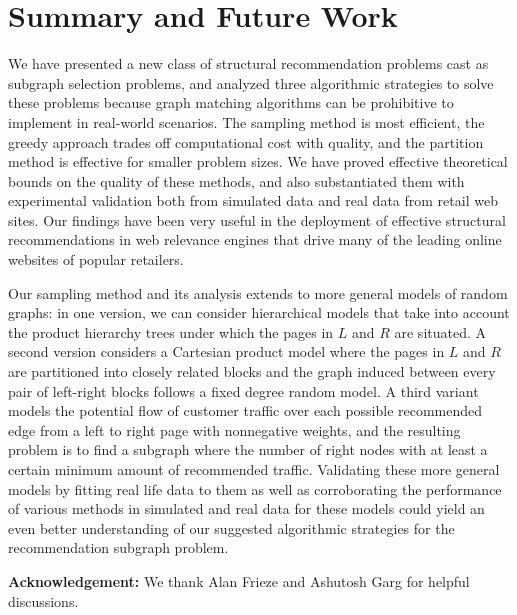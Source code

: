 \section{Summary and Future Work}
We have presented a new class of structural recommendation problems
cast as subgraph selection problems, and analyzed three algorithmic
strategies to solve these problems because graph matching algorithms can be
prohibitive to implement in real-world scenarios. The sampling method is most
efficient, the greedy approach trades off computational cost with
quality, and the partition method is effective for smaller problem
sizes. We have proved effective theoretical bounds on the quality
of these methods, and also substantiated them with experimental
validation both from simulated data and real data from
retail web sites. Our findings have been very useful in the
deployment of effective structural recommendations in web relevance
engines that drive many of the leading online websites of popular
retailers. \vs

Our sampling method and its analysis extends to more general
models of random graphs: in one version, we can consider
hierarchical models that take into account the product hierarchy
trees under which the pages in $L$ and $R$ are situated. A second
version considers a Cartesian product model where the pages in $L$
and $R$ are partitioned into closely related blocks and the graph
induced between every pair of left-right blocks follows a fixed
degree random model. A third variant models the potential flow of
customer traffic over each possible recommended edge from a left to
right page with nonnegative weights, and the resulting problem is
to find a subgraph where the number of right nodes with at least a
certain minimum amount of recommended traffic. Validating these
more general models by fitting real life data to them as well as
corroborating the performance of various methods in simulated and
real data for these models could yield an even better understanding
of our suggested algorithmic strategies for the 
recommendation subgraph problem.\vs

{\bf Acknowledgement:} We thank Alan Frieze and Ashutosh Garg for helpful
discussions.

\vspace{-.1in}